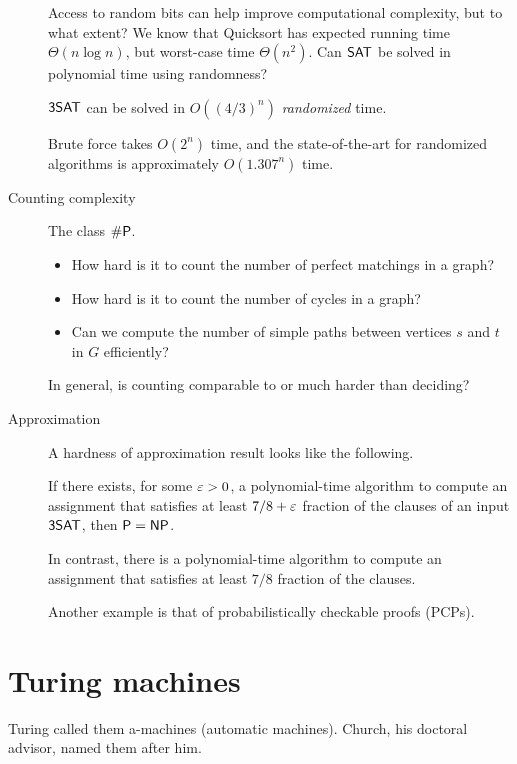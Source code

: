 \begin{description}
        Access to random bits can help improve computational complexity,
        but to what extent?
        We know that Quicksort has expected running time $\Theta(n \log n)$,
        but worst-case time $\Theta(n^2)$.
        Can $\mathsf{SAT}$ be solved in polynomial time using randomness?
        \begin{fact}[Schoening99]
            $\mathsf{3SAT}$ can be solved in $O((4/3)^n)$ \emph{randomized} time.
        \end{fact}
        Brute force takes $O(2^n)$ time, and the state-of-the-art for
        randomized algorithms is approximately $O(1.307^n)$ time.
    \item[Counting complexity] The class $\#\mathsf{P}$.
        \begin{itemize}
            \item How hard is it to count the number of perfect matchings
                in a graph?
            \item How hard is it to count the number of cycles in a graph?
            \item Can we compute the number of simple paths between vertices
                $s$ and $t$ in $G$ efficiently?
        \end{itemize}
        In general, is counting comparable to or much harder than deciding?
    \item[Approximation]
        A hardness of approximation result looks like the following.
        \begin{theorem}[Hastad, 1997]
            If there exists, for some $\varepsilon > 0$, a polynomial-time
            algorithm to compute an assignment that satisfies at least
            $7/8 + \varepsilon$ fraction of the clauses of an input $\mathsf{3SAT}$,
            then $\mathsf{P} = \mathsf{NP}$.
        \end{theorem}
        In contrast, there is a polynomial-time algorithm to compute an
        assignment that satisfies at least $7/8$ fraction of the clauses.

        Another example is that of probabilistically checkable proofs
        (PCPs).
\end{description}

\chapter{Turing machines} \label{chp:turing}
Turing called them a-machines (automatic machines).
Church, his doctoral advisor, named them after him.

